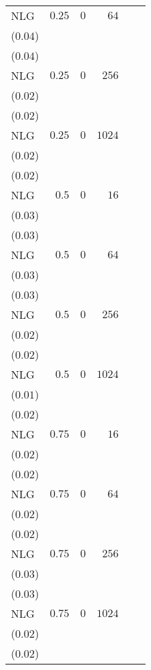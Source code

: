 \begin{table}[t]
\begin{tabular}{lrrrrr}
NLG & \(0.25\) & \(0\) & \(64\) & \longcell{\(0.37\)\\{\tiny(\(0.04\))}} & \longcell{\(0.38\)\\{\tiny(\(0.04\))}} \\[2.2ex]
NLG & \(0.25\) & \(0\) & \(256\) & \longcell{\(0.34\)\\{\tiny(\(0.02\))}} & \longcell{\(0.35\)\\{\tiny(\(0.02\))}} \\[2.2ex]
NLG & \(0.25\) & \(0\) & \(1024\) & \longcell{\(0.32\)\\{\tiny(\(0.02\))}} & \longcell{\(0.32\)\\{\tiny(\(0.02\))}} \\[2.2ex]
NLG & \(0.5\) & \(0\) & \(16\) & \longcell{\(0.41\)\\{\tiny(\(0.03\))}} & \longcell{\(0.42\)\\{\tiny(\(0.03\))}} \\[2.2ex]
NLG & \(0.5\) & \(0\) & \(64\) & \longcell{\(0.39\)\\{\tiny(\(0.03\))}} & \longcell{\(0.40\)\\{\tiny(\(0.03\))}} \\[2.2ex]
NLG & \(0.5\) & \(0\) & \(256\) & \longcell{\(0.33\)\\{\tiny(\(0.02\))}} & \longcell{\(0.34\)\\{\tiny(\(0.02\))}} \\[2.2ex]
NLG & \(0.5\) & \(0\) & \(1024\) & \longcell{\(0.30\)\\{\tiny(\(0.01\))}} & \longcell{\(0.31\)\\{\tiny(\(0.02\))}} \\[2.2ex]
NLG & \(0.75\) & \(0\) & \(16\) & \longcell{\(0.40\)\\{\tiny(\(0.02\))}} & \longcell{\(0.41\)\\{\tiny(\(0.02\))}} \\[2.2ex]
NLG & \(0.75\) & \(0\) & \(64\) & \longcell{\(0.38\)\\{\tiny(\(0.02\))}} & \longcell{\(0.39\)\\{\tiny(\(0.02\))}} \\[2.2ex]
NLG & \(0.75\) & \(0\) & \(256\) & \longcell{\(0.33\)\\{\tiny(\(0.03\))}} & \longcell{\(0.34\)\\{\tiny(\(0.03\))}} \\[2.2ex]
NLG & \(0.75\) & \(0\) & \(1024\) & \longcell{\(0.29\)\\{\tiny(\(0.02\))}} & \longcell{\(0.29\)\\{\tiny(\(0.02\))}} \\[2.2ex]

\end{tabular}
\end{table}
